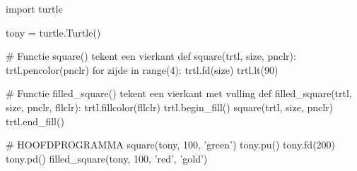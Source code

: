 \documentclass[../main]{subfiles}
\begin{document}
\begin{antwoord}
\begin{python-breakable}[style=mu-noframe, aboveskip=0pt]
import turtle

tony = turtle.Turtle()

# Functie square() tekent een vierkant
def square(trtl, size, pnclr):
    trtl.pencolor(pnclr)
    for zijde in range(4):
        trtl.fd(size)
        trtl.lt(90)

# Functie filled_square() tekent een vierkant met vulling
def filled_square(trtl, size, pnclr, fllclr):
    trtl.fillcolor(fllclr)
    trtl.begin_fill()
    square(trtl, size, pnclr)
    trtl.end_fill()
    
# HOOFDPROGRAMMA
square(tony, 100, 'green')
tony.pu()
tony.fd(200)
tony.pd()
filled_square(tony, 100, 'red', 'gold')    
\end{python-breakable}
\end{antwoord}
\end{document}
